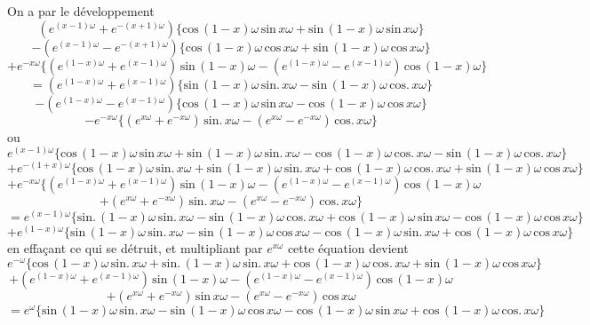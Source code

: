 \documentclass[11pt,a4paper]{article}
\begin{document}
On a par le développement
\[ (e^{(x-1)\omega} + e^{-(x+1)\omega})\{\text{cos}\,(1-x)\omega\,\text{sin}\,x\omega + \text{sin}\,(1-x)\omega\,\text{sin}\,x\omega\} \]
\[ - (e^{(x-1)\omega} - e^{-(x+1)\omega})\{\text{cos}\,(1-x)\omega\,\text{cos}\,x\omega + \text{sin}\,(1-x)\omega\,\text{cos}\,x\omega\} \]
\[ + e^{-x\omega}\{(e^{(1-x)\omega} + e^{(x-1)\omega})\,\text{sin}\,(1-x)\omega - (e^{(1-x)\omega} - e^{(x-1)\omega})\,\text{cos}\,(1-x)\omega\} \]
\[ = (e^{(1-x)\omega} + e^{(x-1)\omega})\{\text{sin}\,(1-x)\omega\,\text{sin}.\,x\omega - \text{sin}\,(1-x)\omega\,\text{cos}.\,x\omega\} \]
\[ - (e^{(1-x)\omega} - e^{(x-1)\omega})\{\text{cos}\,(1-x)\omega\,\text{sin}\,x\omega - \text{cos}\,(1-x)\omega\,\text{cos}\,x\omega\} \]
\[ - e^{-x\omega}\{(e^{x\omega} + e^{-x\omega})\,\text{sin}.\,x\omega - (e^{x\omega} - e^{-x\omega})\,\text{cos}.\,x\omega\} \]
ou
\[ e^{(x-1)\omega}\{\text{cos}\,(1-x)\omega\,\text{sin}\,x\omega + \text{sin}\,(1-x)\omega\,\text{sin}.\,x\omega - \text{cos}\,(1-x)\omega\,\text{cos}.\,x\omega - \text{sin}\,(1-x)\omega\,\text{cos}.\,x\omega\} \]
\[ + e^{-(1+x)\omega}\{\text{cos}\,(1-x)\omega\,\text{sin}.\,x\omega + \text{sin}\,(1-x)\omega\,\text{sin}.\,x\omega + \text{cos}\,(1-x)\omega\,\text{cos}.\,x\omega + \text{sin}\,(1-x)\omega\,\text{cos}\,x\omega\} \]
\[ + e^{-x\omega}\{(e^{(1-x)\omega} + e^{(x-1)\omega})\,\text{sin}\,(1-x)\omega - (e^{(1-x)\omega} - e^{(x-1)\omega})\,\text{cos}\,(1-x)\omega \]
\[ + (e^{x\omega} + e^{-x\omega})\,\text{sin}.\,x\omega - (e^{x\omega} - e^{-x\omega})\,\text{cos}.\,x\omega\} \]
\[ = e^{(x-1)\omega}\{\text{sin}.\,(1-x)\omega\,\text{sin}.\,x\omega - \text{sin}\,(1-x)\omega\,\text{cos}.\,x\omega + \text{cos}\,(1-x)\omega\,\text{sin}\,x\omega - \text{cos}\,(1-x)\omega\,\text{cos}\,x\omega\} \]
\[ + e^{(1-x)\omega}\{\text{sin}\,(1-x)\omega\,\text{sin}.\,x\omega - \text{sin}\,(1-x)\omega\,\text{cos}\,x\omega - \text{cos}\,(1-x)\omega\,\text{sin}.\,x\omega + \text{cos}\,(1-x)\omega\,\text{cos}\,x\omega\} \]
en effaçant ce qui se détruit, et multipliant par $e^{x\omega}$ cette équation devient
\[ e^{-\omega}\{\text{cos}\,(1-x)\omega\,\text{sin}.\,x\omega + \text{sin}.\,(1-x)\omega\,\text{sin}.\,x\omega + \text{cos}\,(1-x)\omega\,\text{cos}.\,x\omega + \text{sin}\,(1-x)\omega\,\text{cos}\,x\omega\} \]
\[ + (e^{(1-x)\omega} + e^{(x-1)\omega})\,\text{sin}\,(1-x)\omega - (e^{(1-x)\omega} - e^{(x-1)\omega})\,\text{cos}\,(1-x)\omega \]
\[ + (e^{x\omega} + e^{-x\omega})\,\text{sin}\,x\omega - (e^{x\omega} - e^{-x\omega})\,\text{cos}\,x\omega \]
\[ = e^{\omega}\{\text{sin}\,(1-x)\omega\,\text{sin}.\,x\omega - \text{sin}\,(1-x)\omega\,\text{cos}\,x\omega - \text{cos}\,(1-x)\omega\,\text{sin}\,x\omega + \text{cos}\,(1-x)\omega\,\text{cos}.\,x\omega\} \]
\end{document}

